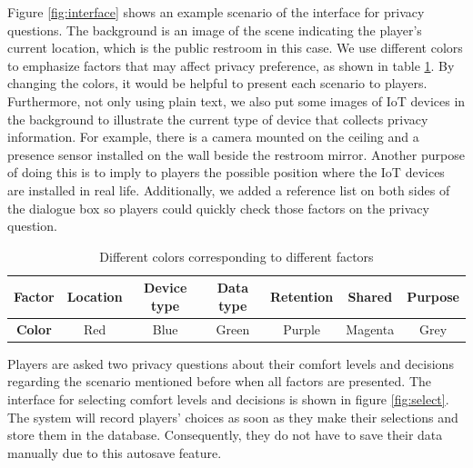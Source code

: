 \documentclass[msc,deptreport,ai]{infthesis}      %
\begin{document}
Figure \ref{fig:interface} shows an example scenario of the interface for privacy questions. The background is an image of the scene indicating the player's current location, which is the public restroom in this case. We use different colors to emphasize factors that may affect privacy preference, as shown in table \ref{tab:color}. By changing the colors, it would be helpful to present each scenario to players. Furthermore, not only using plain text, we also put some images of IoT devices in the background to illustrate the current type of device that collects privacy information. For example, there is a camera mounted on the ceiling and a presence sensor installed on the wall beside the restroom mirror. Another purpose of doing this is to imply to players the possible position where the IoT devices are installed in real life. Additionally, we added a reference list on both sides of the dialogue box so players could quickly check those factors on the privacy question.

\begin{table}[htbp]
    \begin{center}
    \begin{tabular}{ |c|c|c|c|c|c|c|}
        \hline
        \textbf{Factor} & Location & Device type & Data type & Retention & Shared & Purpose\\
        \hline
        \textbf{Color}& Red & Blue & Green & Purple & Magenta & Grey \\
        \hline
        \end{tabular} 
    \end{center}
    \caption{Different colors corresponding to different factors}
    \label{tab:color}
\end{table}

Players are asked two privacy questions about their comfort levels and decisions regarding the scenario mentioned before when all factors are presented. The interface for selecting comfort levels and decisions is shown in figure \ref{fig:select}. The system will record players' choices as soon as they make their selections and store them in the database. Consequently, they do not have to save their data manually due to this autosave feature.
\end{document}
